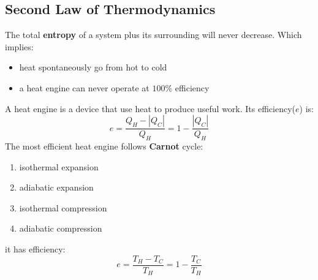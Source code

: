\documentclass[10pt,a4paper,oneside]{article}
\begin{document}
\subsection{Second Law of Thermodynamics}
The total \textbf{entropy} of a system plus its surrounding will never decrease. Which implies:
\begin{itemize}
	\item heat spontaneously go from hot to cold
	\item a heat engine can never operate at $100\%$ efficiency
\end{itemize}
A heat engine is a device that use heat to produce useful work. Its efficiency($e$) is:
\[
e = \frac{Q_H - |Q_C|}{Q_H} = 1 - \frac{|Q_C|}{Q_H}
\]
The most efficient heat engine follows \textbf{Carnot} cycle:
\begin{enumerate}
	\item isothermal expansion
	\item adiabatic expansion
	\item isothermal compression
	\item adiabatic compression
\end{enumerate}
it has efficiency:
\[
e = \frac{T_H - T_C}{T_H} = 1 - \frac{T_C}{T_H}
\]
\end{document}
